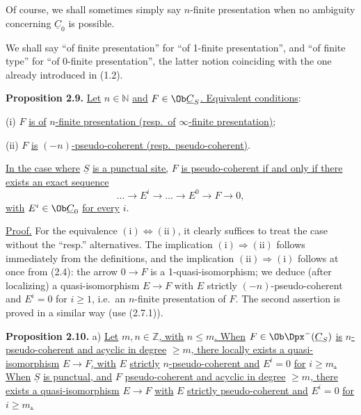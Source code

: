 Of course, we shall sometimes simply say \(n\)-finite presentation when no ambiguity concerning \(\underline{C}_0\) is possible.

We shall say ``of finite presentation'' for ``of 1-finite presentation'', and ``of finite type'' for ``of 0-finite presentation'', the latter notion coinciding with the one already introduced in (1.2).

\textbf{Proposition 2.9.} \uline{Let} \(n\in\mathbb N\) \uline{and} \(F\in\Ob\underline{C}_S\)\uline{. Equivalent conditions}:

(i) \(F\) \uline{is of} \(n\)\uline{-finite presentation (resp.\ of} \(\infty\)\uline{-finite presentation)};

(ii) \(F\) \uline{is} \((-n)\)\uline{-pseudo-coherent (resp.\ pseudo-coherent)}.

\uline{In the case where} \(\underline{S}\) \uline{is a punctual site,} \(F\) \uline{is pseudo-coherent if and only if there exists an exact sequence}
\[
  \ldots\longrightarrow E^i\longrightarrow\ldots\longrightarrow E^0\longrightarrow F\longrightarrow 0,
\]
\uline{with} \(E^i\in\Ob\underline{C}_0\) \uline{for every} \(i\).

\uline{Proof.} For the equivalence \((\mathrm{i})\Leftrightarrow(\mathrm{ii})\), it clearly suffices to treat the case without the ``resp.'' alternatives. The implication \((\mathrm{i})\Rightarrow(\mathrm{ii})\) follows immediately from the definitions, and
%
the implication \((\mathrm{ii})\Rightarrow(\mathrm{i})\) follows at once from (2.4): the arrow \(0\to F\) is a 1-quasi-isomorphism; we deduce (after localizing) a quasi-isomorphism \(E\longrightarrow F\) with \(E\) strictly \((-n)\)-pseudo-coherent and \(E^i=0\) for \(i\geq 1\), i.e.\ an \(n\)-finite presentation of \(F\). The second assertion is proved in a similar way (use (2.7.1)).

\textbf{Proposition 2.10.} a) \uline{Let} \(m,n\in\mathbb Z\)\uline{, with} \(n\leq m\)\uline{. When} \(F\in\Ob\Dpx^-(\underline{C}_S)\) \uline{is} \(n\)\uline{-pseudo-coherent and acyclic in degree} \(\geq m\)\uline{, there locally exists a quasi-isomorphism} \(E\longrightarrow F\)\uline{, with} \(E\) \uline{strictly} \(n\)\uline{-pseudo-coherent and} \(E^i=0\) \uline{for} \(i\geq m\)\uline{. When} \(\underline{S}\) \uline{is punctual, and} \(F\) \uline{pseudo-coherent and acyclic in degree} \(\geq m\)\uline{, there exists a quasi-isomorphism} \(E\longrightarrow F\) \uline{with} \(E\) \uline{strictly pseudo-coherent and} \(E^i=0\) \uline{for} \(i\geq m\)\uline{.}

